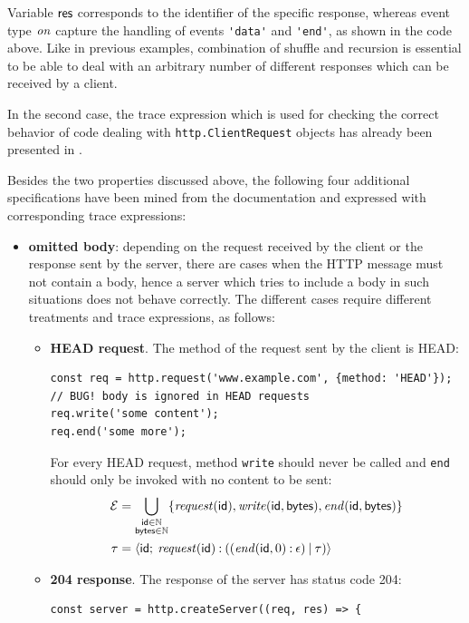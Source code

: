 Variable \(\mathsf{res}\) corresponds to the identifier of the specific response, whereas event type \(\mathit{on}\) capture the handling of events \lstinline{'data'} and \lstinline{'end'}, as shown in the code above.
Like in previous examples, combination of shuffle and recursion is essential to be able to deal with an arbitrary number of different responses which can be received by a client.

In the second case, the trace expression which is used for checking the correct behavior of code dealing with
\lstinline{http.ClientRequest} objects has already been presented in .

Besides the two properties discussed above, the following four additional specifications have been mined from
the documentation and expressed with corresponding trace expressions:
\begin{itemize}
	\item \textbf{omitted body}: depending on the request received by the client or the response sent by the server, there are cases when the HTTP message must not contain a body, hence a server which tries to include a body in such situations does not behave correctly. The different cases require different treatments and trace expressions, as follows:
	\begin{itemize}
	  \item \textbf{HEAD request}. The method of the request sent by the client is HEAD:
		\begin{lstlisting}[belowskip=-3em]
const req = http.request('www.example.com', {method: 'HEAD'});
// BUG! body is ignored in HEAD requests
req.write('some content');
req.end('some more');
		\end{lstlisting}
		For every HEAD request, method \lstinline|write| should never be called and \lstinline|end| should only be invoked with no content to be sent:
		\begin{align*}
			\mathcal{E} &= \bigcup_{\substack{\mathsf{id} \in \mathbb{N} \\ \mathsf{bytes} \in \mathbb{N}}}
			\{ \mathit{request}(\mathsf{id}), \mathit{write}(\mathsf{id}, \mathsf{bytes}), \mathit{end}(\mathsf{id}, \mathsf{bytes}) \} \\
			\tau &= {\langle}\mathsf{\mathsf{id}};\:{\mathit{request}(\mathsf{id}) \mathbin{:} ((\mathit{end}(\mathsf{id}, 0) \mathbin{:} \epsilon) \mathbin{|} \tau)}{\rangle}
		\end{align*}
		\item \textbf{204 response}. The response of the server has status code 204:
		\begin{lstlisting}[belowskip=-3em]
const server = http.createServer((req, res) => {

\end{lstlisting}
\end{itemize}
\end{itemize}
